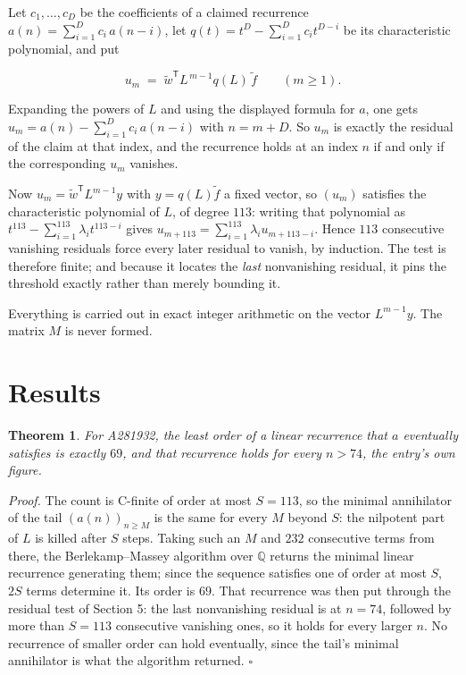\documentclass[11pt]{article}
\newtheorem{theorem}{Theorem}
\theoremstyle{definition}
\begin{document}
Let $c_1,\dots,c_D$ be the coefficients of a claimed recurrence $a(n) = \sum_{i=1}^{D} c_i\,a(n-i)$, let $q(t) = t^{D} - \sum_{i=1}^{D} c_i t^{D-i}$ be its characteristic polynomial, and put

\[u_m \;=\; \tilde w^{\mathsf T} L^{\,m-1} q(L)\,\tilde f \qquad (m \ge 1).\]

Expanding the powers of $L$ and using the displayed formula for $a$, one gets $u_m = a(n) - \sum_{i=1}^{D} c_i\,a(n-i)$ with $n = m + D$. So $u_m$ is exactly the residual of the claim at that index, and the recurrence holds at an index $n$ if and only if the corresponding $u_m$ vanishes.

Now $u_m = \tilde w^{\mathsf T} L^{m-1} y$ with $y = q(L)\tilde f$ a fixed vector, so $(u_m)$ satisfies the characteristic polynomial of $L$, of degree $113$: writing that polynomial as $t^{113} - \sum_{i=1}^{113} \lambda_i t^{113-i}$ gives $u_{m+113} = \sum_{i=1}^{113} \lambda_i u_{m+113-i}$. Hence $113$ consecutive vanishing residuals force every later residual to vanish, by induction. The test is therefore finite; and because it locates the {\itshape last} nonvanishing residual, it pins the threshold exactly rather than merely bounding it.

Everything is carried out in exact integer arithmetic on the vector $L^{m-1}y$. The matrix $M$ is never formed.

\section{Results}

\begin{theorem} For A281932, the least order of a linear recurrence that $a$ eventually satisfies is exactly $69$, and that recurrence holds for every $n > 74$, the entry's own figure.\end{theorem}

{\itshape Proof.} The count is C-finite of order at most $S = 113$, so the minimal annihilator of the tail $(a(n))_{n \ge M}$ is the same for every $M$ beyond $S$: the nilpotent part of $L$ is killed after $S$ steps. Taking such an $M$ and $232$ consecutive terms from there, the Berlekamp--Massey algorithm over $\mathbb{Q}$ returns the minimal linear recurrence generating them; since the sequence satisfies one of order at most $S$, $2S$ terms determine it. Its order is $69$. That recurrence was then put through the residual test of Section 5: the last nonvanishing residual is at $n = 74$, followed by more than $S = 113$ consecutive vanishing ones, so it holds for every larger $n$. No recurrence of smaller order can hold eventually, since the tail's minimal annihilator is what the algorithm returned. $\square$
\end{document}
